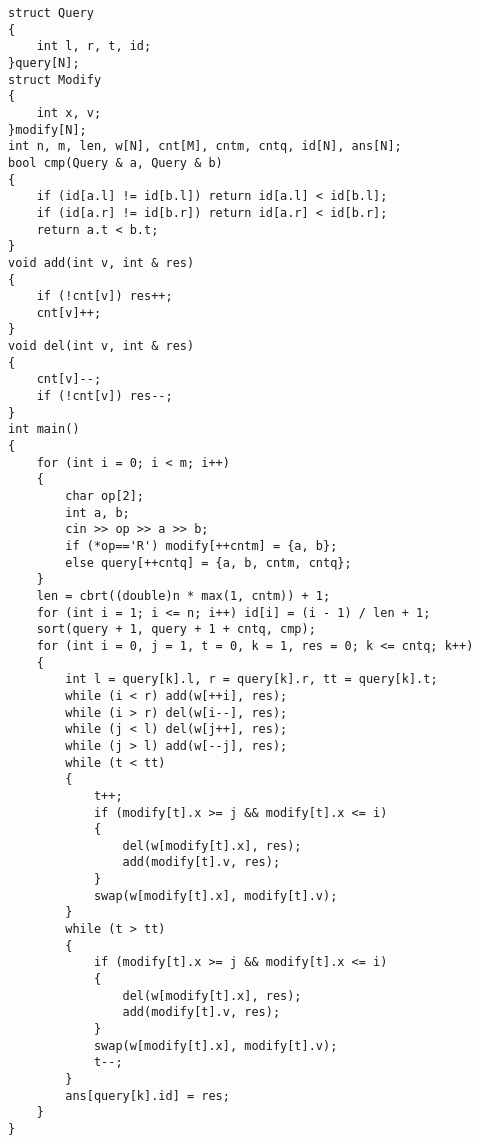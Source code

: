 \documentclass[a4paper,fontset=none]{ctexart}
\begin{document}
\begin{verbatim}
struct Query
{
    int l, r, t, id;
}query[N];
struct Modify
{
    int x, v;
}modify[N];
int n, m, len, w[N], cnt[M], cntm, cntq, id[N], ans[N];
bool cmp(Query & a, Query & b)
{
    if (id[a.l] != id[b.l]) return id[a.l] < id[b.l];
    if (id[a.r] != id[b.r]) return id[a.r] < id[b.r];
    return a.t < b.t;
}
void add(int v, int & res)
{
    if (!cnt[v]) res++;
    cnt[v]++;
}
void del(int v, int & res)
{
    cnt[v]--;
    if (!cnt[v]) res--;
}
int main()
{
    for (int i = 0; i < m; i++)
    {
        char op[2];
        int a, b;
        cin >> op >> a >> b;
        if (*op=='R') modify[++cntm] = {a, b};
        else query[++cntq] = {a, b, cntm, cntq};
    }
    len = cbrt((double)n * max(1, cntm)) + 1;
    for (int i = 1; i <= n; i++) id[i] = (i - 1) / len + 1;
    sort(query + 1, query + 1 + cntq, cmp);
    for (int i = 0, j = 1, t = 0, k = 1, res = 0; k <= cntq; k++)
    {
        int l = query[k].l, r = query[k].r, tt = query[k].t;
        while (i < r) add(w[++i], res);
        while (i > r) del(w[i--], res);
        while (j < l) del(w[j++], res);
        while (j > l) add(w[--j], res);
        while (t < tt)
        {
            t++;
            if (modify[t].x >= j && modify[t].x <= i)
            {
                del(w[modify[t].x], res);
                add(modify[t].v, res);
            }
            swap(w[modify[t].x], modify[t].v);
        }
        while (t > tt)
        {
            if (modify[t].x >= j && modify[t].x <= i)
            {
                del(w[modify[t].x], res);
                add(modify[t].v, res);
            }
            swap(w[modify[t].x], modify[t].v);
            t--;
        }
        ans[query[k].id] = res;
    }
}
\end{verbatim}
\end{document}
